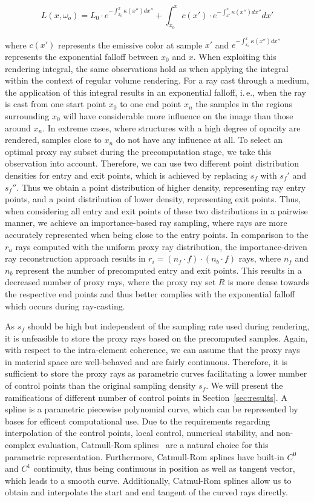 \documentclass[journal]{vgtc}                %
\begin{document}
$$ L(x,\omega_o) = L_0 \cdot e^{-\int_{x_0}^{x}\kappa(x'')dx''} + \int_{x_0}^{x}  \! c(x') \cdot e^{-\int_{x'}^{x}\kappa(x'')dx''} dx'$$

\noindent where $c(x')$ represents the emissive color at sample $x'$ and $e^{-\int_{x_0}^{x}\kappa(x'')dx''}$ represents the exponential falloff between $x_0$ and $x$. When exploiting this rendering integral, the same observations hold as when applying the integral within the context of regular volume rendering. For a ray cast through a medium, the application of this integral results in an exponential falloff, i.\,e., when the ray is cast from one start point $x_0$ to one end point $x_n$ the samples in the regions surrounding $x_0$ will have considerable more influence on the image than those around $x_n$. In extreme cases, where structures with a high degree of opacity are rendered, samples close to $x_n$ do not have any influence at all. To select an optimal proxy ray subset during the precomputation stage, we take this observation into account. Therefore, we can use two different point distribution densities for entry and exit points, which is achieved by replacing $s_f$ with $s_f'$ and $s_f''$. Thus we obtain a point distribution of higher density, representing ray entry points, and a point distribution of lower density, representing exit points. Thus, when considering all entry and exit points of these two distributions in a pairwise manner, we achieve an importance-based ray sampling, where rays are more accurately represented when being close to the entry points. In comparison to the $r_u$ rays computed with the uniform proxy ray distribution, the importance-driven ray reconstruction approach results in $r_i = (n_{f} \cdot f) \cdot (n_{b} \cdot f)$ rays, where $n_{f}$ and $n_{b}$ represent the number of precomputed entry and exit points. This results in a decreased number of proxy rays, where the proxy ray set $R$ is more dense towards the respective end points and thus better complies with the exponential falloff which occurs during ray-casting.

As $s_f$ should be high but independent of the sampling rate used during rendering, it is unfeasible to store the proxy rays based on the precomputed samples. Again, with respect to the intra-element coherence, we can assume that the proxy rays in material space are well-behaved and are fairly continuous. Therefore, it is sufficient to store the proxy rays as parametric curves facilitating a lower number of control points than the original sampling density $s_f$. We will present the ramifications of different  number of control points in Section~\ref{sec:results}. A spline is a parametric piecewise polynomial curve, which can be represented by bases for efficent computational use. Due to the requirements regarding interpolation of the control points, local control, numerical stability, and non-complex evaluation, Catmull-Rom splines~\cite{catmull74splines} are a natural choice for this parametric representation. Furthermore, Catmull-Rom splines have built-in $C^{0}$ and $C^{1}$ continuity, thus being continuous in position as well as tangent vector, which leads to a smooth curve. Additionally, Catmul-Rom splines allow us to obtain and interpolate the start and end tangent of the curved rays directly.
\end{document}
